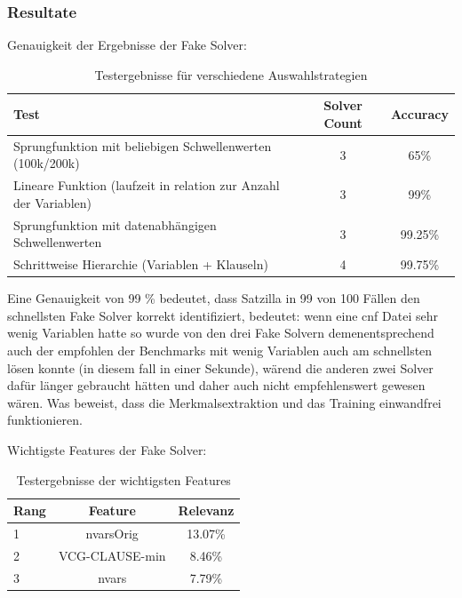 \newpage

\subsubsection{Resultate}

Genauigkeit der Ergebnisse der Fake Solver:

\begin{table}[htbp]
    \centering
    \begin{tabular}{lcc}
        \textbf{Test} & \textbf{Solver Count} & \textbf{Accuracy} \\
        \toprule
        Sprungfunktion mit beliebigen Schwellenwerten (100k/200k) & 3 & 65\% \\
        \midrule
        Lineare Funktion (laufzeit in relation zur Anzahl der Variablen) & 3 & 99\% \\
        \midrule
        Sprungfunktion mit datenabhängigen Schwellenwerten & 3 & 99.25\% \\
        \midrule
        Schrittweise Hierarchie (Variablen + Klauseln) & 4 & 99.75\% \\
        \bottomrule
    \end{tabular}
    \caption{Testergebnisse für verschiedene Auswahlstrategien}\label{tab:test_results}
\end{table}

Eine Genauigkeit von 99 \% bedeutet, dass Satzilla in 99 von 100 Fällen den schnellsten Fake Solver 
korrekt identifiziert, bedeutet: wenn eine cnf Datei sehr wenig Variablen hatte so wurde von den drei 
Fake Solvern demenentsprechend auch der empfohlen der Benchmarks mit wenig Variablen auch am schnellsten lösen konnte (in diesem fall in einer Sekunde),
wärend die anderen zwei Solver dafür länger gebraucht hätten und daher auch nicht empfehlenswert gewesen wären. 
Was beweist, dass die Merkmalsextraktion und das Training einwandfrei funktionieren.



Wichtigste Features der Fake Solver:

\begin{table}[htbp]
    \centering
    \begin{tabular}{lcc}
        \textbf{Rang} & \textbf{Feature} & \textbf{Relevanz} \\
        \toprule
        1 & nvarsOrig & 13.07\% \\
        \midrule
        2 & VCG-CLAUSE-min & 8.46\% \\
        \midrule
        3 & nvars & 7.79\% \\
        \bottomrule
    \end{tabular}
    \caption{Testergebnisse der wichtigsten Features}\label{tab:feature_results}
\end{table}

